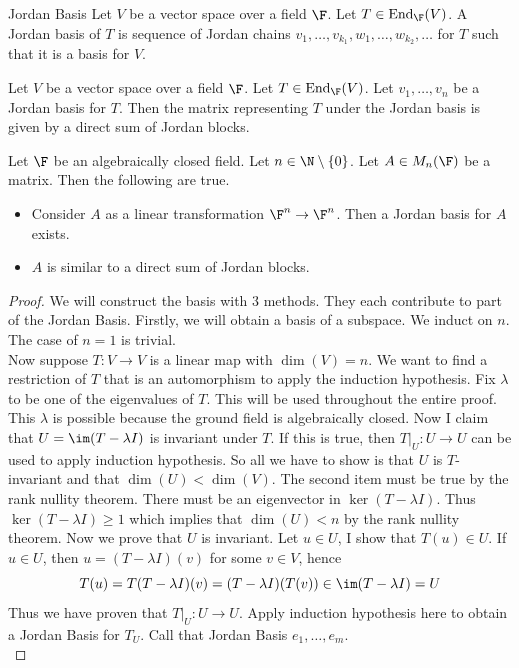 \documentclass[a4paper]{article}
\begin{document}
\begin{defn}{Jordan Basis}{} Let $V$ be a vector space over a field $\F$. Let $T\in\text{End}_\F(V)$. A Jordan basis of $T$ is sequence of Jordan chains $v_1,\dots,v_{k_1},w_1,\dots,w_{k_2},\dots$ for $T$ such that it is a basis for $V$. 
\end{defn}

\begin{prp}{}{} Let $V$ be a vector space over a field $\F$. Let $T\in\text{End}_\F(V)$. Let $v_1,\dots,v_n$ be a Jordan basis for $T$. Then the matrix representing $T$ under the Jordan basis is given by a direct sum of Jordan blocks. 
\end{prp}

\begin{thm}{}{} Let $\F$ be an algebraically closed field. Let $n\in\N\setminus\{0\}$. Let $A\in M_n(\F)$ be a matrix. Then the following are true. 
\begin{itemize}
\item Consider $A$ as a linear transformation $\F^n\to\F^n$. Then a Jordan basis for $A$ exists. 
\item $A$ is similar to a direct sum of Jordan blocks. 
\end{itemize} 
\begin{proof} We will construct the basis with $3$ methods. They each contribute to part of the Jordan Basis. Firstly, we will obtain a basis of a subspace. We induct on $n$. The case of $n=1$ is trivial. \\
Now suppose $T:V\to V$ is a linear map with $\dim(V)=n$. We want to find a restriction of $T$ that is an automorphism to apply the induction hypothesis. Fix $\lambda$ to be one of the eigenvalues of $T$. This will be used throughout the entire proof. This $\lambda$ is possible because the ground field is algebraically closed. Now I claim that $U=\im(T-\lambda I)$ is invariant under $T$. If this is true, then $T|_U:U\to U$ can be used to apply induction hypothesis. So all we have to show is that $U$ is $T$-invariant and that $\dim(U)<\dim(V)$. The second item must be true by the rank nullity theorem. There must be an eigenvector in $\ker(T-\lambda I)$. Thus $\ker(T-\lambda I)\geq 1$ which implies that $\dim(U)<n$ by the rank nullity theorem. Now we prove that $U$ is invariant. Let $u\in U$, I show that $T(u)\in U$. If $u\in U$, then $u=(T-\lambda I)(v)$ for some $v\in V$, hence $$T(u)=T(T-\lambda I)(v)=(T-\lambda I)(T(v))\in\im(T-\lambda I)=U$$ Thus we have proven that $T|_U:U\to U$. Apply induction hypothesis here to obtain a Jordan Basis for $T_U$. Call that Jordan Basis $e_1,\dots,e_m$. \\

\end{proof}
\end{thm}
\end{document}
